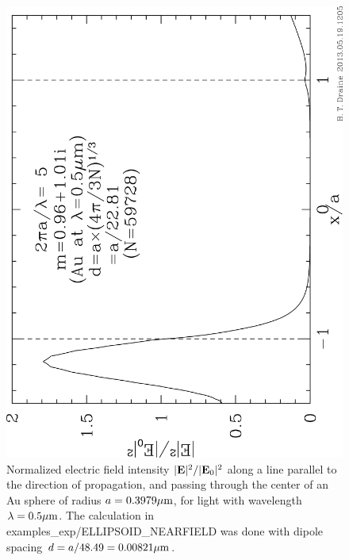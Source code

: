 \begin{figure}
\begin{center}
\vspace*{-0.1cm}
\includegraphics[width=8.cm,angle=270]{f_ellipsoid_nf.png}
\vspace*{-0.4cm}
\caption{\label{fig:ellipsoid_E^2}
         \footnotesize
        Normalized electric field intensity $|{\bf E}|^2/|{\bf E}_0|^2$ along a line
        parallel to the direction of propagation, and passing through
        the center of an Au sphere of radius $a=0.3979{\mu{\rm m}}$, for
        light with wavelength $\lambda=0.5{\mu{\rm m}}$.
        The calculation in examples\_exp/ELLIPSOID\_NEARFIELD was
        done with dipole spacing $d=a/48.49=0.00821{\mu{\rm m}}$.
        }
\end{center}
\end{figure}

